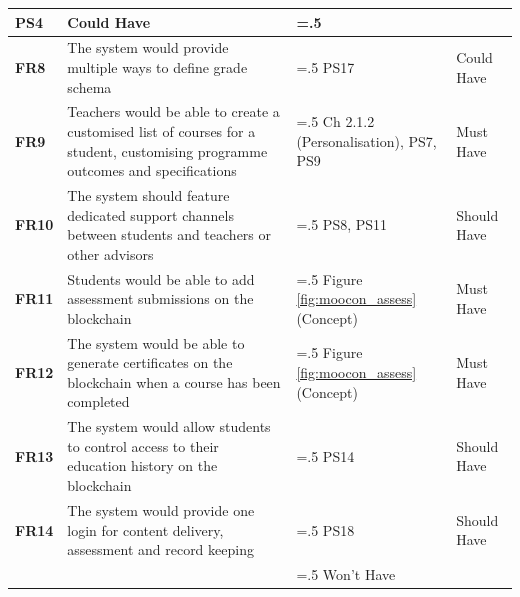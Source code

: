 \begin{table}[!h]
\begin{tabularx}{\textwidth}{>{\bfseries}l>{\hsize=1.5\hsize}X>{\hsize=.5\hsize}Xl}
		PS4                                                       & Could Have
		\\\midrule
		FR8                                                       & The system would provide multiple ways to define grade schema                     & PS17
		                                                          & Could Have
		\\\midrule
		FR9                                                       & Teachers would be able to create a customised list of courses
		for a student, customising programme outcomes and specifications
		                                                          & Ch 2.1.2 (Personalisation), PS7, PS9                                              & Must Have
		\\\midrule
		FR10                                                      & The system should feature dedicated support channels between students and teachers
		or other advisors
		                                                          & PS8, PS11                                                                         & Should Have
		\\\midrule
		FR11                                                      & Students would be able to add assessment submissions on the blockchain
		                                                          & Figure \ref{fig:moocon_assess} (Concept)                                          & Must Have
		\\\midrule
		FR12                                                      & The system would be able to generate certificates on the blockchain when a course
		has been completed                                        & Figure \ref{fig:moocon_assess} (Concept)                                          & Must Have
		\\\midrule
		FR13                                                      & The system would allow students to control access to their education history
		on the blockchain                                         & PS14                                                                              & Should Have
		\\\midrule
		FR14                                                      & The system would provide one login for content delivery, assessment and
		record keeping                                            & PS18                                                                              & Should Have
		\\\midrule
		                                                          & \multicolumn{2}{c}{Requirements targetting PS6, PS10, PS13, PS16}                 & Won't Have
		\\\bottomrule
	\end{tabularx}
\end{table}

